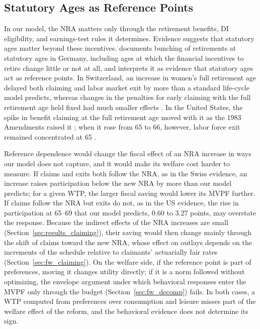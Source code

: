 \subsection{Statutory Ages as Reference Points}\label{sec:disc_reference}

In our model, the NRA matters only through the retirement benefits, DI eligibility, and earnings-test rules it determines. Evidence suggests that statutory ages matter beyond these incentives. \citet{seibold2021reference} documents bunching of retirements at statutory ages in Germany, including ages at which the financial incentives to retire change little or not at all, and interprets it as evidence that statutory ages act as reference points. In Switzerland, an increase in women's full retirement age delayed both claiming and labor market exit by more than a standard life-cycle model predicts, whereas changes in the penalties for early claiming with the full retirement age held fixed had much smaller effects \citep{Lalive2023how}. In the United States, the spike in benefit claiming at the full retirement age moved with it as the 1983 Amendments raised it \citep{behagel2012}; when it rose from 65 to 66, however, labor force exit remained concentrated at 65 \citep{Deshpande2024how}.

Reference dependence would change the fiscal effect of an NRA increase in ways our model does not capture, and it would make its welfare cost harder to measure. If claims and exits both follow the NRA, as in the Swiss evidence, an increase raises participation below the new NRA by more than our model predicts; for a given WTP, the larger fiscal saving would lower its MVPF further. If claims follow the NRA but exits do not, as in the US evidence, the rise in participation at 65--69 that our model predicts, 0.60 to 3.27 points, may overstate the response. Because the indirect effects of the NRA increases are small (Section~\ref{sec:results_claiming}), their saving would then change mainly through the shift of claims toward the new NRA, whose effect on outlays depends on the increments of the schedule relative to claimants' actuarially fair rates (Section~\ref{sec:fw_claiming}). On the welfare side, if the reference point is part of preferences, moving it changes utility directly; if it is a norm followed without optimizing, the envelope argument under which behavioral responses enter the MVPF only through the budget (Section~\ref{sec:fw_decomp}) fails. In both cases, a WTP computed from preferences over consumption and leisure misses part of the welfare effect of the reform, and the behavioral evidence does not determine its sign.

